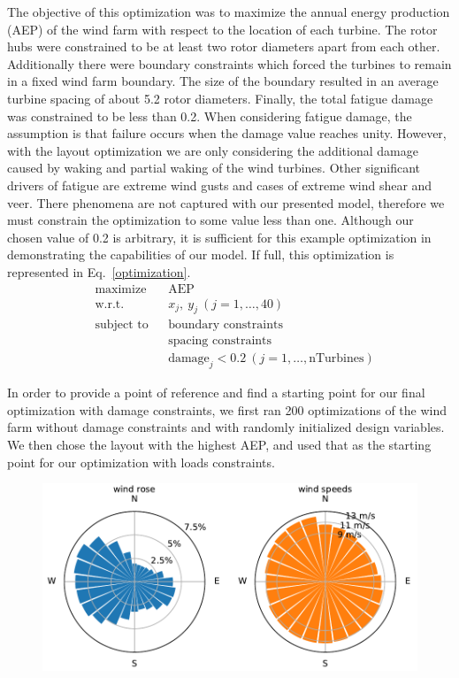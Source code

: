 \documentclass[11pt,letterpaper]{article}
\begin{document}
The objective of this optimization was to maximize the annual energy production (AEP) of the wind farm with respect to the location of each turbine. The rotor hubs were constrained to be at least two rotor diameters apart from each other. Additionally there were boundary constraints which forced the turbines to remain in a fixed wind farm boundary. The size of the boundary resulted in an average turbine spacing of about 5.2 rotor diameters. Finally, the total fatigue damage was constrained to be less than 0.2. When considering fatigue damage, the assumption is that failure occurs when the damage value reaches unity. However, with the layout optimization we are only considering the additional damage caused by waking and partial waking of the wind turbines. Other significant drivers of fatigue are extreme wind gusts and cases of extreme wind shear and veer. There phenomena are not captured with our presented model, therefore we must constrain the optimization to some value less than one. Although our chosen value of 0.2 is arbitrary, it is sufficient for this example optimization in demonstrating the capabilities of our model. If full, this optimization is represented in Eq.~\ref{optimization}.
% 
\begin{equation}
			\begin{aligned}
				& \text{maximize}
					& & \text{AEP} \\
                & \text{w.r.t.} 
                	&& x_j,~ y_j ~ (j = 1, \ldots, 40)\\
				& \text{subject to}
					& & \text{boundary constraints} \\
						&&& \text{spacing constraints} \\
						&&& \text{damage}_j < 0.2 ~ (j = 1, \ldots, \text{nTurbines})
			\end{aligned}
		\label{optimization}
		\end{equation}

In order to provide a point of reference and find a starting point for our final optimization with damage constraints, we first ran 200 optimizations of the wind farm without damage constraints and with randomly initialized design variables. We then chose the layout with the highest AEP, and used that as the starting point for our optimization with loads constraints.
\begin{figure}
    \centering
    \includegraphics{images/windrose.pdf}
    \caption{}
    \label{windrose}
\end{figure}
\end{document}
